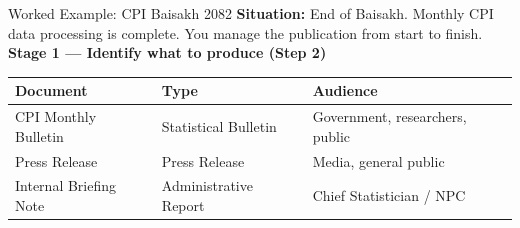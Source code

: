 \documentclass[xcolor={table,dvipsnames},aspectratio=169,11pt]{beamer}
\begin{document}
\begin{frame}{Worked Example: CPI Baisakh 2082}
    \textbf{Situation:} End of Baisakh. Monthly CPI data processing is complete. You manage the publication from start to finish.
    \vskip 0.3cm
    \textbf{Stage 1 --- Identify what to produce (Step 2)}
    \vskip 0.2cm
    \footnotesize
    \begin{tabular}{lll}
    \toprule
    \rowcolor{nsoBlue}\color{white}\bfseries Document & \color{white}\bfseries Type & \color{white}\bfseries Audience \\
    \midrule
    CPI Monthly Bulletin & Statistical Bulletin & Government, researchers, public \\
    Press Release & Press Release & Media, general public \\
    Internal Briefing Note & Administrative Report & Chief Statistician / NPC \\
    \bottomrule
    \end{tabular}
\end{frame}
\end{document}
